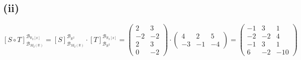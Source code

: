 \documentclass{article}
\begin{document}
\subsection*{(ii)}

\[
[S \circ T]_{\mathcal{B}_{M_2(\mathbb{R})}}^{\mathcal{B}_{\mathbb{R}_2[x]}} = 
[S]^{\mathcal{B}_{\mathbb{R}^2}}_{\mathcal{B}_{M_2(\mathbb{R})}} \cdot
[T]_{\mathcal{B}_{\mathbb{R}^2}}^{\mathcal{B}_{\mathbb{R}_2[x]}} =
\begin{pmatrix}
2 & 3 \\
-2 & -2 \\
2 & 3 \\
0 & -2
\end{pmatrix}
\cdot
\begin{pmatrix}
4 & 2 & 5 \\
-3 & -1 & -4
\end{pmatrix}
=
\begin{pmatrix}
-1 & 3 & 1 \\
-2 & -2 & 4 \\
-1 & 3 & 1 \\
6 & -2 & -10
\end{pmatrix}
\]
\end{document}
